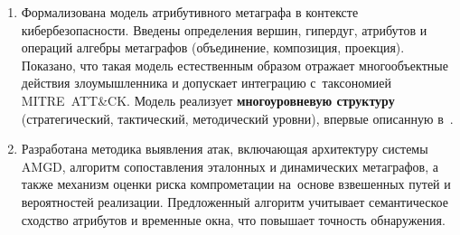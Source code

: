 
\begin{enumerate}
    \item Формализована модель атрибутивного метаграфа в контексте кибербезопасности. Введены определения вершин, гипердуг, атрибутов и операций алгебры метаграфов (объединение, композиция, проекция). Показано, что такая модель естественным образом отражает многообъектные действия злоумышленника и допускает интеграцию с~таксономией MITRE~ATT\&CK. Модель реализует \textbf{многоуровневую структуру} (стратегический, тактический, методический уровни), впервые описанную в~\cite{Latypov2020}. 


    \item Разработана методика выявления атак, включающая архитектуру системы AMGD, алгоритм сопоставления эталонных и динамических метаграфов, а также механизм оценки риска компрометации на~основе взвешенных путей и вероятностей реализации. Предложенный алгоритм учитывает семантическое сходство атрибутов и временные окна, что повышает точность обнаружения. 
    


\end{enumerate}
